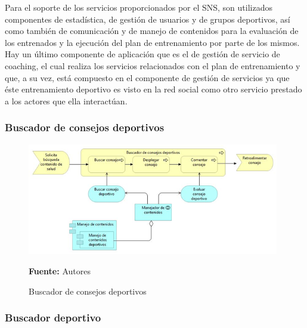 Para el soporte de los servicios proporcionados por el SNS, son utilizados componentes de estadística, de gestión de usuarios y de grupos deportivos, así como también de comunicación y de manejo de contenidos para la evaluación de los entrenados y la ejecución del plan de entrenamiento por parte de los mismos. Hay un último componente de aplicación que es el de gestión de servicio de coaching, el cual realiza los servicios relacionados con el plan de entrenamiento y que, a su vez, está compuesto en el componente de gestión de servicios ya que éste entrenamiento deportivo es visto en la red social como otro servicio prestado a los actores que ella interactúan.

\subsubsection{Buscador de consejos deportivos}

\begin{figure}[!htb]
  \begin{center}
    \includegraphics[width=11cm]{./imagenes/application_usage/buscadorconsejosdeportivos.png}
    \caption{Buscador de consejos deportivos}
    \label{fig:BP_BuscadorConsejosDeportivos}
    \textbf{Fuente:}  Autores
  \end{center}
\end{figure}

\subsubsection{Buscador deportivo}

